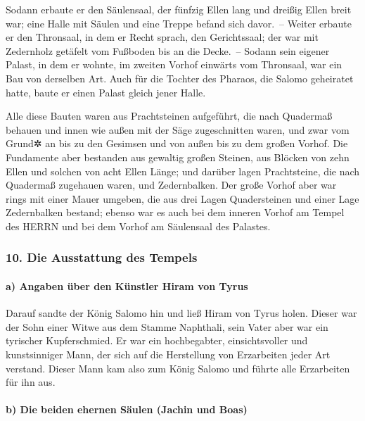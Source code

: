 Sodann erbaute er den Säulensaal, der fünfzig Ellen lang
und dreißig Ellen breit war; eine Halle mit Säulen und eine Treppe
befand sich davor.~-- Weiter erbaute er den Thronsaal, in
dem er Recht sprach, den Gerichtssaal; der war mit Zedernholz getäfelt
vom Fußboden bis an die Decke.~-- Sodann sein eigener
Palast, in dem er wohnte, im zweiten Vorhof einwärts vom Thronsaal, war
ein Bau von derselben Art. Auch für die Tochter des Pharaos, die Salomo
geheiratet hatte, baute er einen Palast gleich jener Halle.

Alle diese Bauten waren aus Prachtsteinen aufgeführt, die
nach Quadermaß behauen und innen wie außen mit der Säge zugeschnitten
waren, und zwar vom Grund✲ an bis zu den Gesimsen und von außen bis zu
dem großen Vorhof. Die Fundamente aber bestanden aus
gewaltig großen Steinen, aus Blöcken von zehn Ellen und solchen von acht
Ellen Länge; und darüber lagen Prachtsteine, die nach
Quadermaß zugehauen waren, und Zedernbalken. Der große
Vorhof aber war rings mit einer Mauer umgeben, die aus drei Lagen
Quadersteinen und einer Lage Zedernbalken bestand; ebenso war es auch
bei dem inneren Vorhof am Tempel des HERRN und bei dem Vorhof am
Säulensaal des Palastes.

\hypertarget{die-ausstattung-des-tempels}{%
\subsubsection{10. Die Ausstattung des
Tempels}\label{die-ausstattung-des-tempels}}

\hypertarget{a-angaben-uxfcber-den-kuxfcnstler-hiram-von-tyrus}{%
\paragraph{a) Angaben über den Künstler Hiram von
Tyrus}\label{a-angaben-uxfcber-den-kuxfcnstler-hiram-von-tyrus}}

Darauf sandte der König Salomo hin und ließ Hiram von
Tyrus holen. Dieser war der Sohn einer Witwe aus dem
Stamme Naphthali, sein Vater aber war ein tyrischer Kupferschmied. Er
war ein hochbegabter, einsichtsvoller und kunstsinniger Mann, der sich
auf die Herstellung von Erzarbeiten jeder Art verstand. Dieser Mann kam
also zum König Salomo und führte alle Erzarbeiten für ihn aus.

\hypertarget{b-die-beiden-ehernen-suxe4ulen-jachin-und-boas}{%
\paragraph{b) Die beiden ehernen Säulen (Jachin und
Boas)}\label{b-die-beiden-ehernen-suxe4ulen-jachin-und-boas}}

